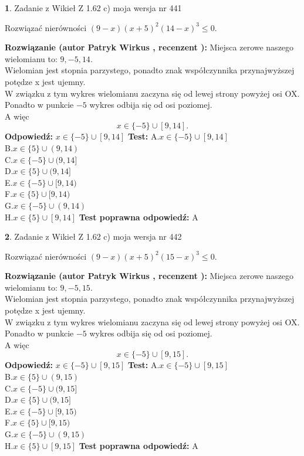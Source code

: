 \documentclass[12pt, a4paper]{article}
\theoremstyle{definition} %
\newtheorem{zad}{}
\newcommand{\zadStart}[1]{\begin{zad}#1\newline}
\newcommand{\zadStop}{\end{zad}}
\newcommand{\rozwStart}[2]{\noindent \textbf{Rozwiązanie (autor #1 , recenzent #2): }\newline}
\newcommand{\rozwStop}{\newline}
\newcommand{\odpStart}{\noindent \textbf{Odpowiedź:}\newline}
\newcommand{\odpStop}{\newline}
\newcommand{\testStart}{\noindent \textbf{Test:}\newline}
\newcommand{\testStop}{\newline}
\newcommand{\kluczStart}{\noindent \textbf{Test poprawna odpowiedź:}\newline}
\newcommand{\kluczStop}{\newline}
\begin{document}
\zadStart{Zadanie z Wikieł Z 1.62 c) moja wersja nr 441}

Rozwiązać nierówności $(9-x)(x+5)^{2}(14-x)^{3}\le0$.
\zadStop
\rozwStart{Patryk Wirkus}{}
Miejsca zerowe naszego wielomianu to: $9, -5, 14$.\\
Wielomian jest stopnia parzystego, ponadto znak współczynnika przy\linebreak najwyższej potędze x jest ujemny.\\ W związku z tym wykres wielomianu zaczyna się od lewej strony powyżej osi OX.\\
Ponadto w punkcie $-5$ wykres odbija się od osi poziomej.\\
A więc $$x \in \{-5\} \cup [9,14].$$
\rozwStop
\odpStart
$x \in \{-5\} \cup [9,14]$
\odpStop
\testStart
A.$x \in \{-5\} \cup [9,14]$\\
B.$x \in \{5\} \cup (9,14)$\\
C.$x \in \{-5\} \cup (9,14]$\\
D.$x \in \{5\} \cup (9,14]$\\
E.$x \in \{-5\} \cup [9,14)$\\
F.$x \in \{5\} \cup [9,14)$\\
G.$x \in \{-5\} \cup (9,14)$\\
H.$x \in \{5\} \cup [9,14]$
\testStop
\kluczStart
A
\kluczStop



\zadStart{Zadanie z Wikieł Z 1.62 c) moja wersja nr 442}

Rozwiązać nierówności $(9-x)(x+5)^{2}(15-x)^{3}\le0$.
\zadStop
\rozwStart{Patryk Wirkus}{}
Miejsca zerowe naszego wielomianu to: $9, -5, 15$.\\
Wielomian jest stopnia parzystego, ponadto znak współczynnika przy\linebreak najwyższej potędze x jest ujemny.\\ W związku z tym wykres wielomianu zaczyna się od lewej strony powyżej osi OX.\\
Ponadto w punkcie $-5$ wykres odbija się od osi poziomej.\\
A więc $$x \in \{-5\} \cup [9,15].$$
\rozwStop
\odpStart
$x \in \{-5\} \cup [9,15]$
\odpStop
\testStart
A.$x \in \{-5\} \cup [9,15]$\\
B.$x \in \{5\} \cup (9,15)$\\
C.$x \in \{-5\} \cup (9,15]$\\
D.$x \in \{5\} \cup (9,15]$\\
E.$x \in \{-5\} \cup [9,15)$\\
F.$x \in \{5\} \cup [9,15)$\\
G.$x \in \{-5\} \cup (9,15)$\\
H.$x \in \{5\} \cup [9,15]$
\testStop
\kluczStart
A
\kluczStop
\end{document}
